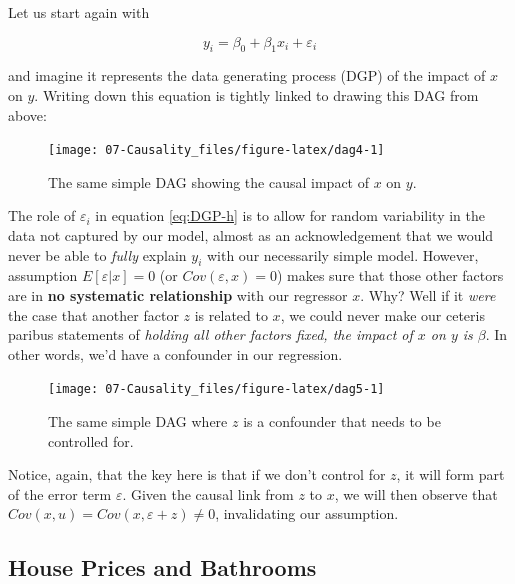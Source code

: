 \documentclass[]{book}
\begin{document}
Let us start again with

\begin{equation}
y_i = \beta_0 + \beta_1 x_i + \varepsilon_i \label{eq:DGP-h}
\end{equation}

and imagine it represents the data generating process (DGP) of the
impact of \(x\) on \(y\). Writing down this equation is tightly linked
to drawing this DAG from above:

\begin{figure}

{\centering \texttt{[image: 07-Causality\_files/figure-latex/dag4-1]} 

}

\caption{The same simple DAG showing the causal impact of $x$ on $y$.}\label{fig:dag4}
\end{figure}

The role of \(\varepsilon_i\) in equation \eqref{eq:DGP-h} is to allow for
random variability in the data not captured by our model, almost as an
acknowledgement that we would never be able to \emph{fully} explain
\(y_i\) with our necessarily simple model. However, assumption
\(E[\varepsilon|x] = 0\) (or \(Cov(\varepsilon,x) = 0\)) makes sure that
those other factors are in \textbf{no systematic relationship} with our
regressor \(x\). Why? Well if it \emph{were} the case that another
factor \(z\) is related to \(x\), we could never make our ceteris
paribus statements of \emph{holding all other factors fixed, the impact
of \(x\) on \(y\) is \(\beta\)}. In other words, we'd have a confounder
in our regression.

\begin{figure}

{\centering \texttt{[image: 07-Causality\_files/figure-latex/dag5-1]} 

}

\caption{The same simple DAG where $z$ is a confounder that needs to be controlled for.}\label{fig:dag5}
\end{figure}

Notice, again, that the key here is that if we don't control for \(z\),
it will form part of the error term \(\varepsilon\). Given the causal
link from \(z\) to \(x\), we will then observe that
\(Cov(x,u) = Cov(x,\varepsilon + z) \neq 0\), invalidating our
assumption.

\subsection{House Prices and
Bathrooms}\label{house-prices-and-bathrooms}
\end{document}
